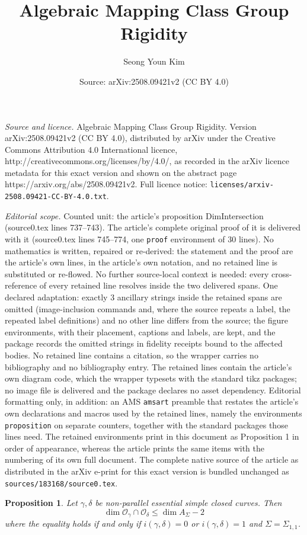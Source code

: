 \documentclass[10pt,a4paper]{amsart}
\title{Algebraic Mapping Class Group Rigidity}
\author{Seong Youn Kim}
\date{Source: arXiv:2508.09421v2 (CC BY 4.0)}
\newtheorem{proposition}{Proposition}
\newcommand{\Ocal}{{\mathcal{O}}}
\begin{document}
\maketitle

\noindent\emph{Source and licence.} Algebraic Mapping Class Group Rigidity. Version arXiv:2508.09421v2 (CC BY 4.0), distributed by arXiv under the Creative Commons Attribution 4.0 International licence, http://creativecommons.org/licenses/by/4.0/, as recorded in the arXiv licence metadata for this exact version and shown on the abstract page https://arxiv.org/abs/2508.09421v2. Full licence notice: \texttt{licenses/arxiv-2508.09421-CC-BY-4.0.txt}.\par\smallskip

\noindent\textit{Editorial scope.} Counted unit: the article's proposition DimIntersection (source0.tex lines 737--743). The article's complete original proof of it is delivered with it (source0.tex lines 745--774, one \texttt{proof} environment of 30 lines). No mathematics is written, repaired or re-derived: the statement and the proof are the article's own lines, in the article's own notation, and no retained line is substituted or re-flowed.  No further source-local context is needed: every cross-reference of every retained line resolves inside the two delivered spans.  One declared adaptation: exactly 3 ancillary strings inside the retained spans are omitted (image-inclusion commands and, where the source repeats a label, the repeated label definitions) and no other line differs from the source; the figure environments, with their placement, captions and labels, are kept, and the package records the omitted strings in fidelity receipts bound to the affected bodies.  No retained line contains a citation, so the wrapper carries no bibliography and no bibliography entry.  The retained lines contain the article's own diagram code, which the wrapper typesets with the standard tikz packages; no image file is delivered and the package declares no asset dependency.  Editorial formatting only, in addition: an AMS \texttt{amsart} preamble that restates the article's own declarations and macros used by the retained lines, namely the environments \texttt{proposition} on separate counters, together with the standard packages those lines need.  The retained environments print in this document as Proposition 1 in order of appearance, whereas the article prints the same items with the numbering of its own full document.  The complete native source of the article as distributed in the arXiv e-print for this exact version is bundled unchanged as \texttt{sources/183168/source0.tex}.
\begin{proposition}\label{DimIntersection}
Let $\gamma, \delta$ be non-parallel essential simple closed curves. Then
\[
\dim \mathcal{O}_{\gamma} \cap \Ocal_{\delta} \leq \dim A_\Sigma - 2
\]
where the equality holds if and only if $i(\gamma,\delta)=0$ or $i(\gamma, \delta) = 1$ and $\Sigma = \Sigma_{1,1}$.
\end{proposition}
\end{document}
